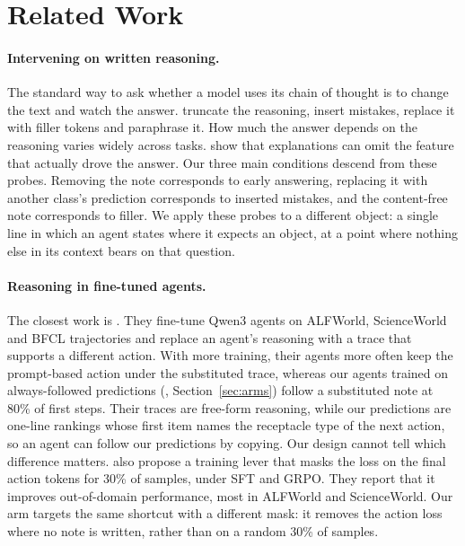 \section{Related Work}
\label{sec:related}

\paragraph{Intervening on written reasoning.}
The standard way to ask whether a model uses its chain of thought is to change the text and watch the answer. \citet{lanham2023faithfulness} truncate the reasoning, insert mistakes, replace it with filler tokens and paraphrase it. How much the answer depends on the reasoning varies widely across tasks. \citet{turpin2023unfaithful} show that explanations can omit the feature that actually drove the answer. Our three main conditions descend from these probes. Removing the note corresponds to early answering, replacing it with another class's prediction corresponds to inserted mistakes, and the content-free note corresponds to filler. We apply these probes to a different object: a single line in which an agent states where it expects an object, at a point where nothing else in its context bears on that question.

\paragraph{Reasoning in fine-tuned agents.}
The closest work is \citet{liu2026cotgains}. They fine-tune Qwen3 agents on ALFWorld, ScienceWorld and BFCL trajectories and replace an agent's reasoning with a trace that supports a different action. With more training, their agents more often keep the prompt-based action under the substituted trace, whereas our agents trained on always-followed predictions (, Section~\ref{sec:arms}) follow a substituted note at 80\% of first steps. Their traces are free-form reasoning, while our predictions are one-line rankings whose first item names the receptacle type of the next action, so an agent can follow our predictions by copying. Our design cannot tell which difference matters. \citet{liu2026cotgains} also propose a training lever that masks the loss on the final action tokens for 30\% of samples, under SFT and GRPO. They report that it improves out-of-domain performance, most in ALFWorld and ScienceWorld. Our  arm targets the same shortcut with a different mask: it removes the action loss where no note is written, rather than on a random 30\% of samples.

